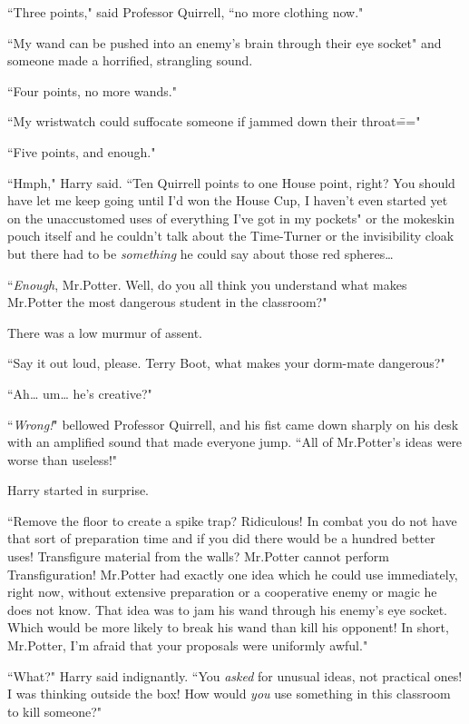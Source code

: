 ``Three points," said Professor Quirrell, ``no more clothing now."

``My wand can be pushed into an enemy's brain through their eye socket" and someone made a horrified, strangling sound.

``Four points, no more wands."

``My wristwatch could suffocate someone if jammed down their throat\==="

``Five points, and enough."

``Hmph," Harry said. ``Ten Quirrell points to one House point, right? You should have let me keep going until I'd won the House Cup, I haven't even started yet on the unaccustomed uses of everything I've got in my pockets" or the mokeskin pouch itself and he couldn't talk about the Time-Turner or the invisibility cloak but there had to be \emph{something} he could say about those red spheres{\ldots}

``\emph{Enough}, Mr.\?Potter. Well, do you all think you understand what makes Mr.\?Potter the most dangerous student in the classroom?"

There was a low murmur of assent.

``Say it out loud, please. Terry Boot, what makes your dorm-mate dangerous?"

``Ah{\ldots} um{\ldots} he's creative?"

``\emph{Wrong!}" bellowed Professor Quirrell, and his fist came down sharply on his desk with an amplified sound that made everyone jump. ``All of Mr.\?Potter's ideas were worse than useless!"

Harry started in surprise.

``Remove the floor to create a spike trap? Ridiculous! In combat you do not have that sort of preparation time and if you did there would be a hundred better uses! Transfigure material from the walls? Mr.\?Potter cannot perform Transfiguration! Mr.\?Potter had exactly one idea which he could use immediately, right now, without extensive preparation or a cooperative enemy or magic he does not know. That idea was to jam his wand through his enemy's eye socket. Which would be more likely to break his wand than kill his opponent! In short, Mr.\?Potter, I'm afraid that your proposals were uniformly awful."

``What?" Harry said indignantly. ``You \emph{asked} for unusual ideas, not practical ones! I was thinking outside the box! How would \emph{you} use something in this classroom to kill someone?"

